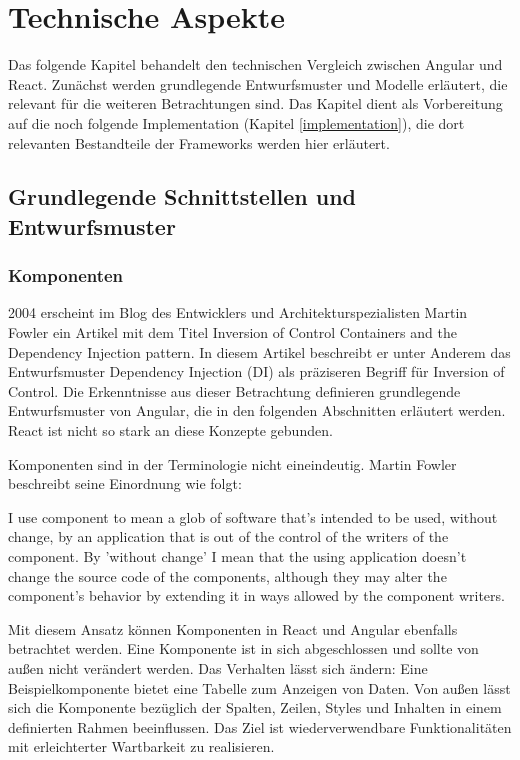\chapter{Technische Aspekte}
Das folgende Kapitel behandelt den technischen Vergleich zwischen Angular und React. Zunächst werden grundlegende Entwurfsmuster und Modelle erläutert, die relevant für die weiteren Betrachtungen sind. 
Das Kapitel dient als Vorbereitung auf die noch folgende Implementation (Kapitel \ref{implementation}), die dort relevanten Bestandteile der Frameworks werden hier erläutert. 

\section{Grundlegende Schnittstellen und Entwurfsmuster}
\subsection{Komponenten}
2004 erscheint im Blog des Entwicklers und Architekturspezialisten Martin Fowler ein Artikel mit dem Titel \glqq Inversion of Control Containers and the Dependency Injection pattern\grqq. In diesem Artikel beschreibt er unter Anderem das Entwurfsmuster Dependency Injection (DI) als präziseren Begriff für Inversion of Control. Die Erkenntnisse aus dieser Betrachtung definieren grundlegende Entwurfsmuster von Angular, die in den folgenden Abschnitten erläutert werden. React ist nicht so stark an diese Konzepte gebunden.

Komponenten sind in der Terminologie nicht eineindeutig. Martin Fowler beschreibt seine Einordnung wie folgt:

\glqq I use component to mean a glob of software that's intended to be used, without change, by an application that is out of the control of the writers of the component. By 'without change' I mean that the using application doesn't change the source code of the components, although they may alter the component's behavior by extending it in ways allowed by the component writers.\grqq\cite{Fowler_Components}

Mit diesem Ansatz können Komponenten in React und Angular ebenfalls betrachtet werden. Eine Komponente ist in sich abgeschlossen und sollte von außen nicht verändert werden. Das Verhalten lässt sich ändern: Eine Beispielkomponente bietet eine Tabelle zum Anzeigen von Daten. Von außen lässt sich die Komponente bezüglich der Spalten, Zeilen, Styles und Inhalten in einem definierten Rahmen beeinflussen. Das Ziel ist wiederverwendbare Funktionalitäten mit erleichterter Wartbarkeit zu realisieren.

